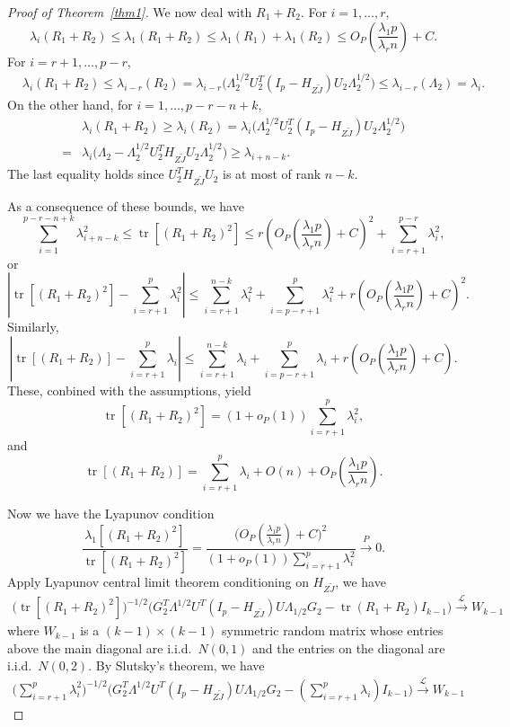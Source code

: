 \documentclass[review]{elsarticle}
\DeclareMathOperator{\mytr}{tr}
\theoremstyle{plain}
\theoremstyle{definition}
\theoremstyle{remark}
\begin{document}
\begin{proof}[\textrm{Proof of Theorem~\ref{thm1}}]
We now deal with $R_1+R_2$.
For $i=1,\ldots, r$,
$$
\lambda_i(R_1+R_2)\leq
\lambda_1(R_1+R_2)\leq \lambda_1(R_1)+\lambda_1(R_2)\leq O_P(\frac{\lambda_1 p}{\lambda_r n}) + C.
$$
For $i=r+1,\ldots, p-r$,
$$
\begin{aligned}
&\lambda_i(R_1+R_2)\leq \lambda_{i-r}(R_2)
=
 \lambda_{i-r}\big( \Lambda_2^{1/2} U_2^T (I_p-H_{Z\tilde{J}})U_2\Lambda_2^{1/2}\big)
\leq
\lambda_{i-r}(\Lambda_2)
=\lambda_i.
\end{aligned}
$$
On the other hand,
for $i=1,\ldots, p-r-n+k$,
$$
\begin{aligned}
&\lambda_i(R_1+R_2)\geq \lambda_i(R_2)
=
 \lambda_i\big( \Lambda_2^{1/2} U_2^T (I_p-H_{Z\tilde{J}})U_2\Lambda_2^{1/2}\big)\\
=&
\lambda_i\big( \Lambda_2- \Lambda_2^{1/2} U_2^T H_{Z\tilde{J}}U_2 \Lambda_2^{1/2}\big)
\geq 
\lambda_{i+n-k}.
\end{aligned}
$$
The last equality holds since $U_2^T H_{Z\tilde{J}}U_2$ is at most of rank $n-k$.

As a consequence of these bounds, we have
$$
\sum_{i=1}^{p-r-n+k}\lambda_{i+n-k}^2\leq \mytr [(R_1+R_2)^2]\leq  r(O_P(\frac{\lambda_1 p}{\lambda_r n})+C)^2+\sum_{i=r+1}^{p-r}\lambda_i^2,
$$
or
$$
| \mytr [(R_1+R_2)^2]-\sum_{i=r+1}^{p}\lambda_{i}^2|\leq 
\sum_{i=r+1}^{n-k}\lambda_{i}^2+
\sum_{i=p-r+1}^{p}\lambda_{i}^2
+
r(O_P(\frac{\lambda_1 p}{\lambda_r n})+C)^2.
$$
Similarly,
$$
| \mytr [(R_1+R_2)]-\sum_{i=r+1}^{p}\lambda_{i}|\leq 
\sum_{i=r+1}^{n-k}\lambda_{i}+
\sum_{i=p-r+1}^{p}\lambda_{i}
+
r(O_P(\frac{\lambda_1 p}{\lambda_r n})+C).
$$
These, conbined with the assumptions, yield
$$
 \mytr [(R_1+R_2)^2]=(1+o_P(1))\sum_{i=r+1}^{p}\lambda_{i}^2,
$$
and
$$
 \mytr [(R_1+R_2)]=\sum_{i=r+1}^{p}\lambda_{i}+O(n)+O_P(\frac{\lambda_1 p}{\lambda_r n}).
$$

Now we have the Lyapunov condition
$$
\frac{\lambda_1[(R_1+R_2)^2]}{
\mytr [(R_1+R_2)^2]
}
=
\frac{
\big( O_P(\frac{\lambda_1 p}{\lambda_r n})+C\big)^2
}{
(1+o_P(1))\sum_{i=r+1}^{p}\lambda_{i}^2
}
\xrightarrow{P} 0.
$$
Apply Lyapunov central limit theorem conditioning on $H_{Z\tilde{J}}$, we have
$$
\begin{aligned}
\big(\mytr[(R_1+R_2)^2]\big)^{-1/2}
\big( G_2^T \Lambda^{1/2}U^T (I_p-H_{Z\tilde{J}})U\Lambda_{1/2}G_2-\mytr(R_1+R_2) I_{k-1} \big)
\xrightarrow{\mathcal{L}} W_{k-1}
\end{aligned}
$$
where $W_{k-1}$ is a $(k-1)\times(k-1)$ symmetric random matrix whose entries above the main diagonal are i.i.d.\ $N(0,1)$ and the entries on the diagonal are i.i.d.\ $N(0,2)$.
By Slutsky's theorem, we have
$$
\begin{aligned}
\big(\sum_{i=r+1}^p \lambda_i^2\big)^{-1/2}
\big( G_2^T \Lambda^{1/2}U^T (I_p-H_{Z\tilde{J}})U\Lambda_{1/2}G_2-(\sum_{i=r+1}^p \lambda_i)I_{k-1} \big)
\xrightarrow{\mathcal{L}}W_{k-1}
\end{aligned}
$$



\end{proof}
\end{document}
